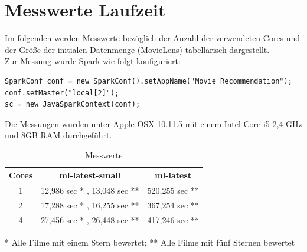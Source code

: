 \section{Messwerte Laufzeit}
Im folgenden werden Messwerte bezüglich der Anzahl der verwendeten Cores und der Größe der initialen Datenmenge (MovieLens\citep{lit:INET4}) tabellarisch dargestellt.\\
Zur Messung wurde Spark wie folgt konfiguriert:
\begin{lstlisting}[caption=Beispiel für Spark Setup mit zwei Cores]
SparkConf conf = new SparkConf().setAppName("Movie Recommendation");
conf.setMaster("local[2]");
sc = new JavaSparkContext(conf);
\end{lstlisting}

Die Messungen wurden unter Apple OSX 10.11.5 mit einem Intel Core i5 2,4 GHz und 8GB RAM durchgeführt.

\begin{table}[h!]
 \centering
 \caption{Messwerte}
 \label{tab:table1}
 \begin{tabular}{ccc}
   \toprule
   Cores & ml-latest-small & ml-latest\\
   \midrule
   1 & 12,986 sec * , 13,048 sec ** & 520,255 sec **\\
   2 & 17,288 sec * , 16,255 sec ** & 367,254 sec **\\
   4 & 27,456 sec * , 26,448 sec ** & 417,246 sec **\\
   \bottomrule
 \end{tabular}
\end{table}

* Alle Filme mit einem Stern bewertet;
** Alle Filme mit fünf Sternen bewertet
